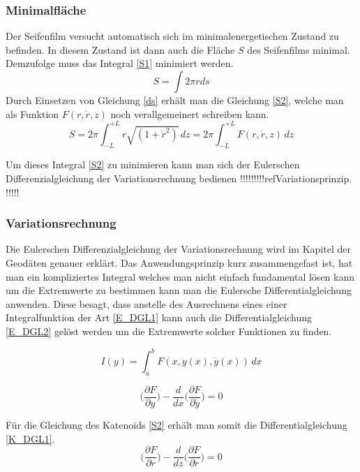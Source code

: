 \begin{refsection}
\subsubsection{Minimalfläche}
Der Seifenfilm versucht automatisch sich im minimalenergetischen Zustand zu befinden. In diesem Zustand ist dann auch die Fläche $S$ des Seifenfilms minimal.
Demzufolge muss das Integral \eqref{S1} minimiert werden. 
\begin{equation} \label{S1}  
  S= \int 2 \pi r ds 
\end{equation}
Durch Einsetzen von Gleichung \eqref{ds} erhält man die Gleichung \eqref{S2}, welche man als Funktion $F(r,\dot r, z)$ noch verallgemeinert schreiben kann.
\begin{equation} \label{S2}
  S=2 \pi \int_{-L}^{+L} r\sqrt{(1+\dot r^2)}\,dz =2 \pi \int_{-L}^{+L}  F(r,\dot r, z) \,dz 
\end{equation}


Um dieses Integral \eqref{S2} zu minimieren kann man sich der Eulerschen Differenzialgleichung der Variationsrechnung bedienen !!!!!!!!!ref{Variationsprinzip}. !!!!!
\subsubsection{Variationsrechnung}
Die Eulerschen Differenzialgleichung der Variationsrechnung wird im Kapitel der Geodäten genauer erklärt.
Das Anwendungsprinzip kurz zusammengefast ist, hat man ein kompliziertes Integral welches man nicht einfach fundamental lösen kann um die Extremwerte zu bestimmen kann man die Eulersche Differentialgleichung anwenden. Diese besagt, dass anstelle des Ausrechnens eines einer Integralfunktion der Art \eqref{E_DGL1} kann auch die Differentialgleichung \eqref{E_DGL2} gelöst werden um die Extremwerte solcher Funktionen zu finden.

\begin{equation} \label{E_DGL1}  
  I(y)= \int_a^b F(x,y(x),\dot y(x))\,dx       
\end{equation}

\begin{equation} \label{E_DGL2}
\bigg(\frac{\partial F}{\partial y}\bigg)- \frac{d}{dx} \bigg(\frac{\partial F}{\partial \dot{y}}\bigg)=0         
\end{equation}

Für die Gleichung des Katenoids \eqref{S2} erhält man somit die Differentialgleichung \eqref{K_DGL1}.
\begin{equation} \label{K_DGL1}
\bigg(\frac{\partial F}{\partial r}\bigg)- \frac{d}{dz} \bigg(\frac{\partial F}{\partial \dot{r}}\bigg)=0    
\end{equation}


\end{refsection}
